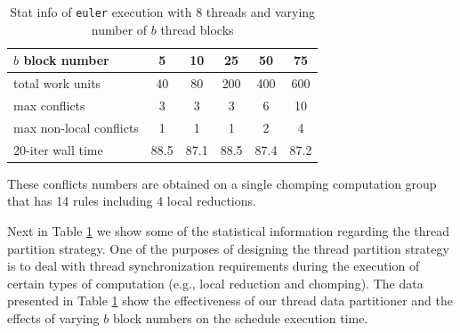 \documentclass{article}
\begin{document}
\begin{table}[h]
  \begin{center}
    \begin{threeparttable}
      \caption{Stat info of \texttt{euler} execution with 8 threads and varying number of $b$ thread blocks\label{tab:euler-block-stat}}
      \begin{tabular}{|l|c|c|c|c|c|}
	\hline
	$b$ block number & 5 & 10 & 25 & 50 & 75\\
	\hline
	total work units & 40 & 80 & 200 & 400 & 600\\
	\hline
	max conflicts\tnote{1} & 3 & 3 & 3 & 6 & 10\\
	max non-local conflicts & 1 & 1 & 1 & 2 & 4\\
	20-iter wall time & 88.5 & 87.1 & 88.5 & 87.4 & 87.2\\
	\hline
      \end{tabular}
      \begin{tablenotes}
      \item [1] These conflicts numbers are obtained on a single
	chomping computation group that has 14 rules including 4 local
	reductions.
      \end{tablenotes}
    \end{threeparttable}
  \end{center}
\end{table}
Next in Table \ref{tab:euler-block-stat} we show some of the statistical
information regarding the thread partition strategy.  One of the purposes
of designing the thread partition strategy is to deal with thread
synchronization requirements during the execution of certain types of
computation (e.g., local reduction and chomping).  The data presented in
Table \ref{tab:euler-block-stat} show the effectiveness of our thread
data partitioner and the effects of varying $b$ block numbers on the
schedule execution time.
\end{document}
